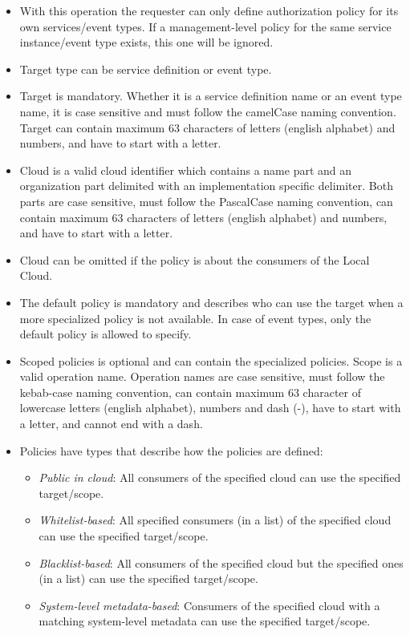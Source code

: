 \documentclass[a4paper]{arrowhead}
\begin{document}
\begin{itemize}
    \item With this operation the requester can only define authorization policy for its own services/event types. If a management-level policy for the same service instance/event type exists, this one will be ignored. 
    \item Target type can be service definition or event type. 
    \item Target is mandatory. Whether it is a service definition name or an event type name, it is case sensitive and must follow the camelCase naming convention. Target can contain maximum 63 characters of letters (english alphabet) and numbers, and have to start with a letter.
    \item Cloud is a valid cloud identifier which contains a name part and an organization part delimited with an implementation specific delimiter. Both parts are case sensitive, must follow the PascalCase naming convention, can contain maximum 63 characters of letters (english alphabet) and numbers, and have to start with a letter.
    \item Cloud can be omitted if the policy is about the consumers of the Local Cloud. 
    \item The default policy is mandatory and describes who can use the target when a more specialized policy is not available. In case of event types, only the default policy is allowed to specify.
    \item Scoped policies is optional and can contain the specialized policies. Scope is a valid operation name. Operation names are case sensitive, must follow the kebab-case naming convention, can contain maximum 63 character of lowercase letters (english alphabet), numbers and dash (-), have to start with a letter, and cannot end with a dash.
    \item Policies have types that describe how the policies are defined:
        \begin{itemize}
            \item \textit{Public in cloud}: All consumers of the specified cloud can use the specified target/scope.
            \item \textit{Whitelist-based}: All specified consumers (in a list) of the specified cloud can use the specified target/scope.
            \item \textit{Blacklist-based}: All consumers of the specified cloud but the specified ones (in a list) can use the specified target/scope.
            \item \textit{System-level metadata-based}: Consumers of the specified cloud with a matching system-level metadata can use the specified target/scope.

\end{itemize}
\end{itemize}
\end{document}
